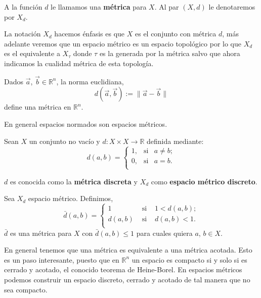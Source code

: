 A la función $d$ le llamamos una \textbf{métrica} para $X$. Al par $(X,d)$ le denotaremos por $X_d$. 

\begin{ob}
La notación $X_d$ hacemos énfasis es que $X$ es el conjunto con métrica $d$, más adelante veremos que un espacio métrico es un espacio topológico por lo que $X_d$ es el equivalente a $X_\tau$ donde $\tau$ es la generada por la métrica salvo que ahora indicamos la cualidad métrica de esta topología.  
\end{ob}

\begin{ej}
 Dados $\vec{a}$, $\vec{b} \in \mathbb{R}^{n}$, la norma euclidiana,
$$d(\vec{a},\vec{b}):=\| \vec{a}-\vec{b} \|$$
define una métrica en $\mathbb{R}^{n}$.
\end{ej}

En general espacios normados son espacios métricos. 
 
\begin{ej}
Sean $X$ un conjunto no vacío y $d : X \times X \to\mathbb{R}$ definida mediante:
$$d(a,b)=\left\{
\begin{array}{lcc}
1, & \text{si} & a \neq b; \\
0, & \text{si} & a=b. \\
\end{array}
\right.$$

$d$ es conocida como la \textbf{métrica discreta} y  $X_{d}$ como \textbf{espacio métrico discreto}.
\end{ej}


\begin{ej}\label{ejem:metrica-acotada}
Sea $X_{d}$ espacio métrico. Definimos,
$$\bar{d}(a,b)=\left\{
\begin{array}{lcc}
1 & \text{ si } & 1 < d(a,b);   \\
d(a,b) & \text{ si } & d(a,b)<1. \\
\end{array}
\right.
$$
$\bar{d}$ es una métrica para $X$ con $\bar{d}(a,b)\leq 1$ para cuales quiera $a$, $b \in X.$ 
\end{ej}


En general tenemos que una métrica es equivalente a una métrica acotada. Esto es un paso interesante, puesto que en $\mathbb{R}^n$ un espacio es compacto si y solo si es cerrado y acotado, el conocido teorema de Heine-Borel. En espacios métricos podemos construir un espacio discreto, cerrado y acotado de tal manera que no sea compacto. 


